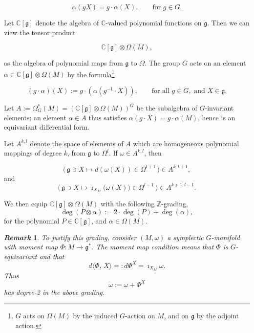 \documentclass{article}
\newtheorem{remark}{\it Remark\/}
\newcommand{\ra}{\rightarrow}
\newcommand{\w}{\omega}
\newcommand{\W}{\Omega}
\newcommand{\CC}{\mathbb{C}}
\newcommand{\ZZ}{\mathbb{Z}}
\newcommand{\mfg}{\mathfrak{g}}
\begin{document}
\begin{equation*}
	\alpha(gX) = g \cdot \alpha(X), \qquad \text{for } g \in G.
\end{equation*}

Let $\CC[\mfg]$ denote the algebra of $\CC$-valued polynomial functions on $\mfg$. Then we can view the tensor product

\begin{equation*}
	\CC[\mfg] \otimes \W(M),
\end{equation*}

as the algebra of polynomial maps from $\mfg$ to $\W$. The group $G$ acts on an element $\alpha \in \CC[\mfg] \otimes \W(M)$ by the formula\footnote{$G$ acts on $\W(M)$ by the induced $G$-action on $M$, and on $\mfg$ by the adjoint action.}

\begin{equation*}
	(g \cdot \alpha)(X) := g \cdot \left( \alpha ( g^{-1} \cdot X )  \right), \qquad \text{for all } g \in G, \text{ and } X \in \mfg.
\end{equation*}

Let $A := \W_{G}^{\ast}(M) = \left( \CC[\mfg] \otimes \W(M) \right)^{G}$ be the subalgebra of $G$-invariant elements; an element $\alpha \in A$ thus satisfies $\alpha(g \cdot X) = g\cdot \alpha(M)$, hence is an equivariant differential form. 

Let $A^{k,l}$ denote the space of elements of $A$ which are homogeneous polynomial mappings of degree $k$, from $\mfg$ to $\W^{l}$. If $\w \in A^{k,l}$, then

\begin{equation*}
	\big(\, \mfg \ni X \longmapsto d(\w(X)) \in \W^{l+1} \, \big)  \in A^{k,l+1},
\end{equation*}
and
\begin{equation*}
	\big(\, \mfg \ni X \longmapsto \imath_{X_{M}}\big(\w(X)\big) \in \W^{l-1} \, \big)  \in A^{k+1,l-1}.
\end{equation*}

We then equip $\CC[\mfg] \otimes \W(M)$ with the following $\ZZ$-grading, 
\begin{equation*}
	\deg(P \otimes \alpha) := 2\cdot \deg(P) + \deg(\alpha),
\end{equation*}
for the polynomial $P \in \CC[\mfg]$, and $\alpha \in \W(M)$.

\begin{remark}
	To justify this grading, consider $(M,\w)$ a symplectic $G$-manifold with moment map $\Phi : M \ra \mfg^{\ast}$. The moment map condition means that $\Phi$ is $G$-equivariant and that
	\begin{equation*}
		d\langle \Phi,\, X \rangle =: d\Phi^{X} = \imath_{X_{M}}\w.
	\end{equation*}
	Thus
	\begin{equation*}
		\tilde{\w} := \w + \Phi^{X} 
	\end{equation*}
	has degree-2 in the above grading.
\end{remark}
\end{document}
